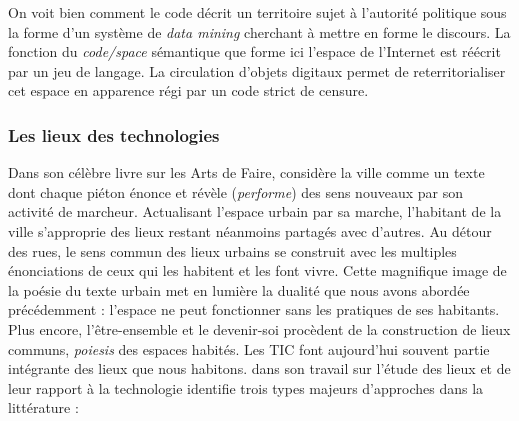 On voit bien comment le code décrit un territoire sujet à l’autorité politique sous la forme d’un système de \textit{data mining} cherchant à mettre en forme le discours. La fonction du \textit{code/space} sémantique que forme ici l’espace de l’Internet est réécrit par un jeu de langage. La circulation d’objets digitaux permet de reterritorialiser cet espace en apparence régi par un code strict de censure. 

\subsubsection{Les lieux des technologies}
Dans son célèbre livre sur les Arts de Faire, \cite{Certeau1980} considère la ville comme un texte dont chaque piéton énonce et révèle (\textit{performe}) des sens nouveaux par son activité de marcheur. Actualisant l’espace urbain par sa marche, l’habitant de la ville s’approprie des lieux restant néanmoins partagés avec d’autres. Au détour des rues, le sens commun des lieux urbains se construit avec les multiples énonciations de ceux qui les habitent et les font vivre. Cette magnifique image de la poésie du texte urbain met en lumière la dualité que nous avons abordée précédemment : l’espace ne peut fonctionner sans les pratiques de ses habitants. Plus encore, l’être-ensemble et le devenir-soi procèdent de la construction de lieux communs, \textit{poiesis} des espaces habités. Les TIC font aujourd’hui souvent partie intégrante des lieux que nous habitons. \cite{Graham1998} dans son travail sur l’étude des lieux et de leur rapport à la technologie identifie trois types majeurs d’approches dans la littérature :



